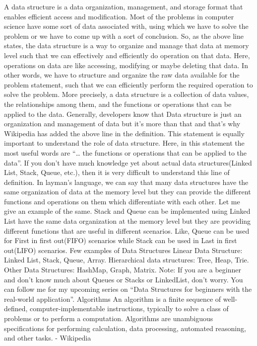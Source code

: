 A data structure is a data organization, management, and storage format that enables efficient access and modification.
Most of the problems in computer science have some sort of data associated with, using which we have to solve the problem or we have to come up with a sort of conclusion.
So, as the above line states, the data structure is a way to organize and manage that data at memory level such that we can effectively and efficiently do operation on that data. Here, operations on data are like accessing, modifying or maybe deleting that data.
In other words, we have to structure and organize the raw data available for the problem statement, such that we can efficiently perform the required operation to solve the problem.
More precisely, a data structure is a collection of data values, the relationships among them, and the functions or operations that can be applied to the data.
Generally, developers know that Data structure is just an organization and management of data but it’s more than that and that’s why Wikipedia has added the above line in the definition. This statement is equally important to understand the role of data structure.
Here, in this statement the most useful words are “… the functions or operations that can be applied to the data”. If you don’t have much knowledge yet about actual data structures(Linked List, Stack, Queue, etc.), then it is very difficult to understand this line of definition.
In layman’s language, we can say that many data structures have the same organization of data at the memory level but they can provide the different functions and operations on them which differentiate with each other.
Let me give an example of the same. Stack and Queue can be implemented using Linked List have the same data organization at the memory level but they are providing different functions that are useful in different scenarios. Like, Queue can be used for First in first out(FIFO) scenarios while Stack can be used in Last in first out(LIFO) scenarios.
Few examples of Data Structures
Linear Data Structure: Linked List, Stack, Queue, Array.
Hierarchical data structures: Tree, Heap, Trie.
Other Data Structures: HashMap, Graph, Matrix.
Note: If you are a beginner and don’t know much about Queues or Stacks or LinkedList, don’t worry. You can follow me for my upcoming series on “Data Structures for beginners with the real-world application”.
Algorithms
An algorithm is a finite sequence of well-defined, computer-implementable instructions, typically to solve a class of problems or to perform a computation. Algorithms are unambiguous specifications for performing calculation, data processing, automated reasoning, and other tasks. - Wikipedia

